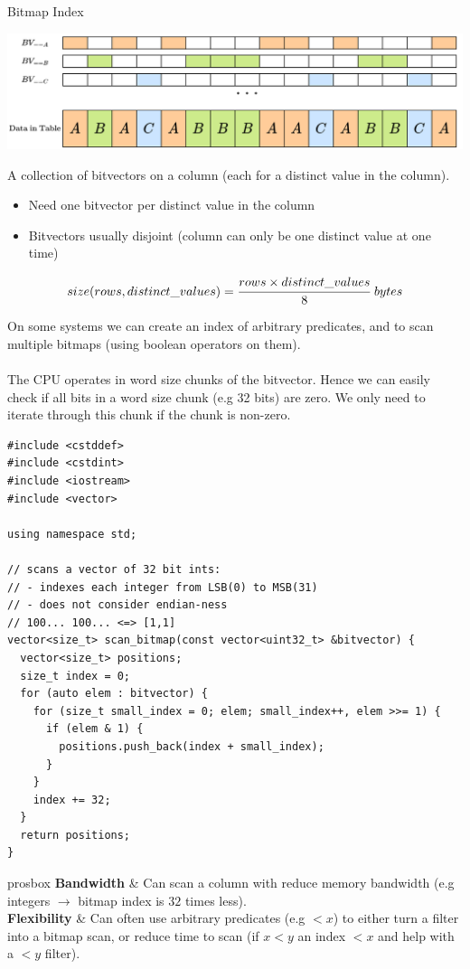 \begin{definitionbox}{Bitmap Index}
    \begin{center}
        \includegraphics[width=.8\textwidth]{algorithms_and_indices/images/bitmap_index.drawio.png}
    \end{center}
    A collection of bitvectors on a column (each for a distinct value in the column).
    \begin{itemize}
        \item Need one bitvector per distinct value in the column
        \item Bitvectors usually disjoint (column can only be one distinct value at one time)
    \end{itemize}
    \[size(rows, distinct\_values) = \cfrac{rows \times distinct\_values}{8} \ bytes\]
\end{definitionbox}
On some systems we can create an index of arbitrary predicates, and to scan multiple bitmaps (using boolean operators on them).
\\
\\ The CPU operates in word size chunks of the bitvector. Hence we can easily check if all bits in a word size chunk (e.g 32 bits) are zero. We only need to iterate through this chunk if the chunk is non-zero.
\begin{verbatim}
#include <cstddef>
#include <cstdint>
#include <iostream>
#include <vector>

using namespace std;

// scans a vector of 32 bit ints:
// - indexes each integer from LSB(0) to MSB(31)
// - does not consider endian-ness
// 100... 100... <=> [1,1]
vector<size_t> scan_bitmap(const vector<uint32_t> &bitvector) {
  vector<size_t> positions;
  size_t index = 0;
  for (auto elem : bitvector) {
    for (size_t small_index = 0; elem; small_index++, elem >>= 1) {
      if (elem & 1) {
        positions.push_back(index + small_index);
      }
    }
    index += 32;
  }
  return positions;
}
\end{verbatim}

\begin{tabbox}{prosbox}
    \textbf{Bandwidth} & Can scan a column with reduce memory bandwidth (e.g integers $\to$ bitmap index is $32$ times less). \\
    \textbf{Flexibility} & Can often use arbitrary predicates (e.g $< x$) to either turn a filter into a bitmap scan, or reduce time to scan (if $x < y$ an index $< x$ and help with a $< y$ filter). \\
\end{tabbox}

